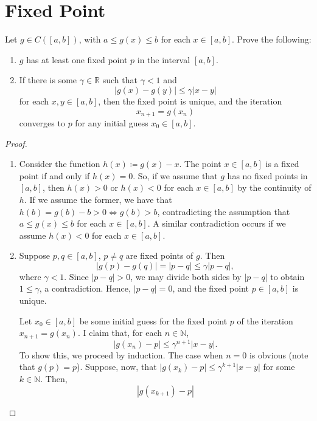 \documentclass{article}
\begin{document}
\section{Fixed Point}

\begin{problem}[Spring 2008~\#1]
Let \(g\in C([a,b])\), with \(a\leq g(x)\leq b\) for each \(x\in [a,b]\).
Prove the following:
\begin{enumerate}
	\item \(g\) has at least one fixed point \(p\) in the interval \([a,b]\).
	\item If there is some \(\gamma\in \mathbb{R}\) such that \(\gamma < 1\) and
	      \[
		      |g(x) - g(y)| \leq \gamma |x-y|
	      \]
	      for each \(x,y\in [a,b]\), then the fixed point is unique, and the iteration
	      \[
		      x_{n+1} = g(x_n)
	      \]
	      converges to \(p\) for any initial guess \(x_0\in [a,b]\).
\end{enumerate}
\end{problem}

\begin{proof}\leavevmode
	\begin{enumerate}
		\item Consider the function \(h(x)\coloneqq g(x) - x\).  The point \(x\in
		      [a,b]\) is a fixed point if and only if \(h(x) = 0\).  So, if we assume
		      that \(g\) has no fixed points in \([a,b]\), then \(h(x) > 0\) or
		      \(h(x) < 0\) for each \(x\in [a,b]\) by the continuity of \(h\).  If
		      we assume the former, we have that \(h(b) = g(b) - b > 0 \iff g(b) >
		      b\), contradicting the assumption that \(a\leq g(x)\leq b\) for each
		      \(x\in [a,b]\).  A similar contradiction occurs if we assume \(h(x) <
		      0\) for each \(x\in [a,b]\).
		\item Suppose \(p,q\in [a,b]\), \(p\neq q\) are fixed points of \(g\).  Then
		      \[
			      |g(p) - g(q)| = |p - q| \leq \gamma |p - q|
			      ,\]
		      where \(\gamma < 1\).  Since \(|p-q| > 0\), we may divide both sides
		      by \(|p-q|\) to obtain \(1 \leq \gamma\), a contradiction.  Hence,
		      \(|p-q| = 0\), and the fixed point \(p\in [a,b]\) is unique.

		      Let \(x_0\in [a,b]\) be some initial guess for the fixed point \(p\)
		      of the iteration \(x_{n+1} = g(x_n)\).  I claim that, for each \(n\in \mathbb{N}\),
		      \[
			      |g(x_n) - p| \leq \gamma^{n+1} |x-y|
			      .\]
		      To show this, we proceed by induction.  The case when \(n=0\) is
		      obvious (note that \(g(p) = p\)).  Suppose, now, that \(|g(x_k) - p|
		      \leq \gamma^{k+1} |x-y|\) for some \(k\in \mathbb{N}\).  Then,
		      \[
			      |g(x_{k+1}) - p|
		      \]
	\end{enumerate}
\end{proof}
\end{document}
